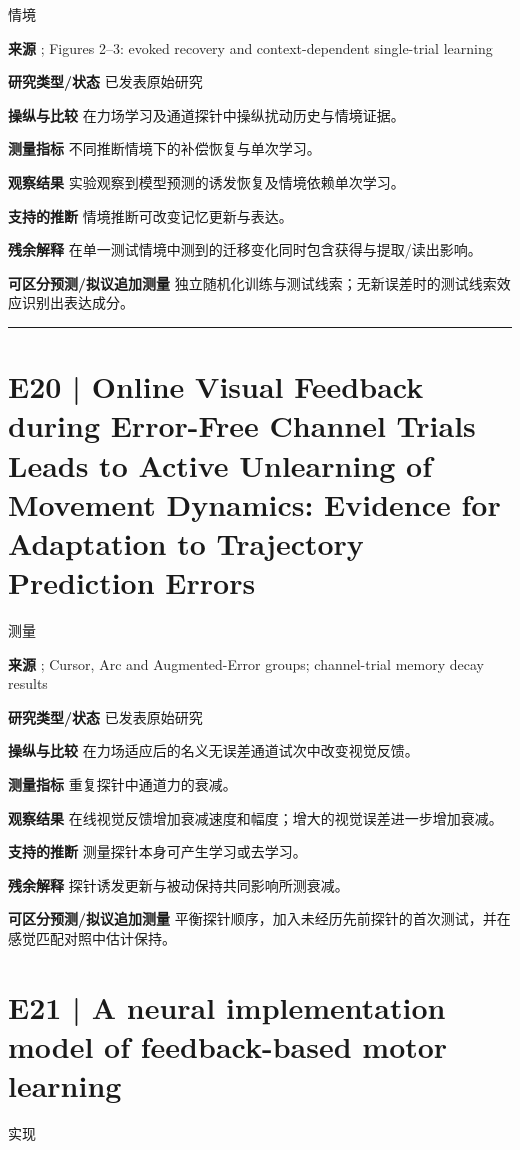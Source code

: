 \documentclass[11pt,a4paper]{article}
\begin{document}
{\small\sffamily\color{navy} 情境}\par
\textbf{来源} \cite{coin2021}; Figures 2--3: evoked recovery and context-dependent single-trial learning\par
\textbf{研究类型/状态} 已发表原始研究\par
\textbf{操纵与比较} 在力场学习及通道探针中操纵扰动历史与情境证据。\par
\textbf{测量指标} 不同推断情境下的补偿恢复与单次学习。\par
\textbf{观察结果} 实验观察到模型预测的诱发恢复及情境依赖单次学习。\par
\textbf{支持的推断} 情境推断可改变记忆更新与表达。\par
\textbf{残余解释} 在单一测试情境中测到的迁移变化同时包含获得与提取/读出影响。\par
\textbf{可区分预测/拟议追加测量} 独立随机化训练与测试线索；无新误差时的测试线索效应识别出表达成分。\par
\bigskip\hrule\medskip\section{E20 | Online Visual Feedback during Error-Free Channel Trials Leads to Active Unlearning of Movement Dynamics: Evidence for Adaptation to Trajectory Prediction Errors}
{\small\sffamily\color{navy} 测量}\par
\textbf{来源} \cite{unlearning2016}; Cursor, Arc and Augmented-Error groups; channel-trial memory decay results\par
\textbf{研究类型/状态} 已发表原始研究\par
\textbf{操纵与比较} 在力场适应后的名义无误差通道试次中改变视觉反馈。\par
\textbf{测量指标} 重复探针中通道力的衰减。\par
\textbf{观察结果} 在线视觉反馈增加衰减速度和幅度；增大的视觉误差进一步增加衰减。\par
\textbf{支持的推断} 测量探针本身可产生学习或去学习。\par
\textbf{残余解释} 探针诱发更新与被动保持共同影响所测衰减。\par
\textbf{可区分预测/拟议追加测量} 平衡探针顺序，加入未经历先前探针的首次测试，并在感觉匹配对照中估计保持。\par
\clearpage\section{E21 | A neural implementation model of feedback-based motor learning}
{\small\sffamily\color{navy} 实现}\par
\end{document}

